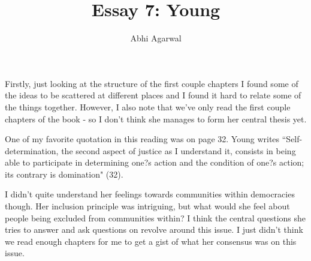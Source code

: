 \documentclass[11pt, oneside]{article}
\title{Essay 7: Young}
\author{Abhi Agarwal}
\date{}
\begin{document}
\maketitle

\par Firstly, just looking at the structure of the first couple chapters I found some of the ideas to be scattered at different places and I found it hard to relate some of the things together. However, I also note that we've only read the first couple chapters of the book - so I don't think she manages to form her central thesis yet.

\par One of my favorite quotation in this reading was on page 32. Young writes ``Self-determination, the second aspect of justice as I understand it, consists in being able to participate in determining one?s action and the condition of one?s action; its contrary is domination" (32). 

\par I didn't quite understand her feelings towards communities within democracies though. Her inclusion principle was intriguing, but what would she feel about people being excluded from communities within? I think the central questions she tries to answer and ask questions on revolve around this issue. I just didn't think we read enough chapters for me to get a gist of what her consensus was on this issue. 
\end{document}
